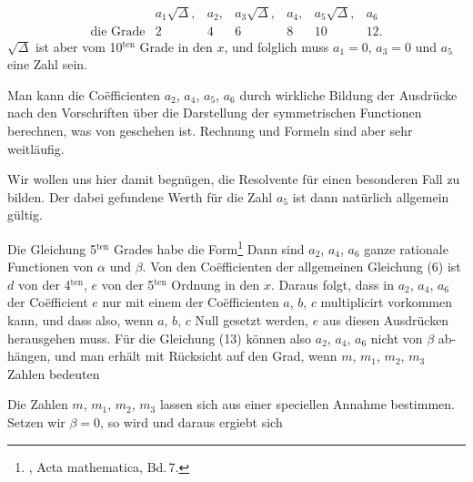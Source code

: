 
\[
\begin{array}{lcccccc}
 & a_1\sqrt{\Delta}, & a_2, & a_3\sqrt{\Delta}, & a_4, & a_5\sqrt{\Delta}, & a_6\\
\text{die Grade} & 2 & 4 & 6 & 8 & 10 & 12.
\end{array}
\]
$\sqrt{\Delta}$ ist aber vom 10$^{\text{ten}}$ Grade in den $x$, und folglich muss $a_1=0$,
$a_3=0$ und $a_5$ eine Zahl sein.

Man kann die Co\"efficienten $a_2$, $a_4$, $a_5$, $a_6$ durch wirkliche
Bildung der Ausdr\"ucke nach den Vorschriften \"uber die Darstellung der symmetrischen
Functionen berechnen, was von  geschehen ist. Rechnung und Formeln sind aber sehr
weitl\"aufig.

Wir wollen uns hier damit begn\"ugen, die Resolvente f\"ur
einen besonderen Fall zu bilden. Der dabei gefundene Werth
f\"ur die Zahl $a_5$ ist dann nat\"urlich allgemein g\"ultig.

Die Gleichung 5$^{\text{ten}}$ Grades habe die 
Form\footnote{, Acta mathematica, Bd.\,7.}
Dann sind $a_2$, $a_4$, $a_6$ ganze rationale Functionen von $\alpha$ und $\beta$.
Von den Co\"efficienten der allgemeinen Gleichung (6) ist $d$ von
der 4$^{\text{ten}}$, $e$ von der 5$^{\text{ten}}$ Ordnung in den $x$. Daraus folgt, dass
in $a_2$, $a_4$, $a_6$ der Co\"efficient $e$ nur mit einem der Co\"efficienten
$a$, $b$, $c$ multiplicirt vorkommen kann, und dass also, wenn $a$, $b$, $c$
Null gesetzt werden, $e$ aus diesen Ausdr\"ucken herausgehen muss.
F\"ur die Gleichung (13) k\"onnen also $a_2$, $a_4$, $a_6$ nicht von $\beta$ ab-
h\"angen, und man erh\"alt mit R\"ucksicht auf den Grad, wenn
$m$, $m_1$, $m_2$, $m_3$ Zahlen bedeuten

Die Zahlen $m$, $m_1$, $m_2$, $m_3$ lassen sich aus einer speciellen
Annahme bestimmen. Setzen wir $\beta=0$, so wird
und daraus ergiebt sich
